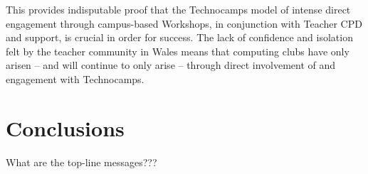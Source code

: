 \documentclass{sig-alternate}
\begin{document}
This provides indisputable proof that the Technocamps model
of intense direct engagement through campus-based Workshops,
in conjunction with Teacher CPD and support, is crucial in order for success.
The lack of confidence and isolation felt by the teacher community
in Wales means that computing clubs have only arisen
-- and will continue to only arise --
through direct involvement of and engagement with Technocamps.


\section{Conclusions}
What are the top-line messages???




%
%
%
\end{document}
